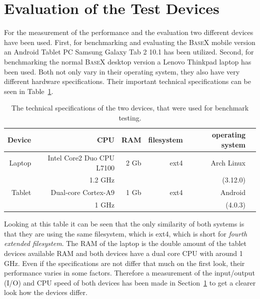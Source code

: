 \section{Evaluation of the Test Devices}
\label{sec:evaluation-of-the-test-devices}
For the measurement of the performance and the evaluation two different devices have been used.
First, for benchmarking and evaluating the \textsc{BaseX} mobile version an Android Tablet PC Samsung Galaxy Tab 2 10.1 has been utilized.
Second, for benchmarking the normal \textsc{BaseX} desktop version a Lenovo Thinkpad laptop has been used.
Both not only vary in their operating system, they also have very different hardware specifications.
Their important technical specifications can be seen in Table~\ref{tab:test-dev-specs}.
\begin {table}[htpb] 
  \centering
\begin {tabular} {|r|r|r|r|r|r|}
  	\hline
	Device&CPU&RAM&filesystem&operating system\\
	\hline
	Laptop&Intel Core2 Duo CPU L7100&2 Gb&ext4&Arch Linux\\
	&1.2 GHz&&&(3.12.0)\\
	\hline
	Tablet&Dual-core Cortex-A9&1 Gb&ext4&Android\\
	&1 GHz&&&(4.0.3)\\
	\hline
\end {tabular}
\caption {The technical specifications of the two devices, that were used for benchmark testing.}
\label {tab:test-dev-specs}
\end {table}
\newpage
Looking at this table it can be seen that the only similarity of both systems is that they are using the same filesystem, which is ext4, which is short for \textit{fourth extended filesystem}.
The RAM of the laptop is the double amount of the tablet devices available RAM and both devices have a dual core CPU with around 1 GHz.
Even if the specifications are not differ that much on the first look, their performance varies in some factors.
Therefore a measurement of the input/output (I/O) and CPU speed of both devices has been made in Section~\ref{sec:evaluation-of-the-test-devices} to get a clearer look how the devices differ.


